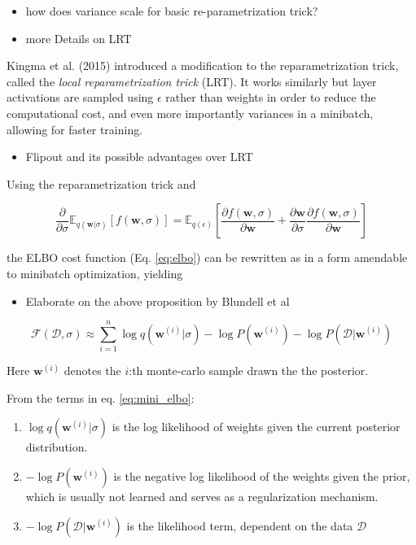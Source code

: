 	\begin{itemize}
		\item how does variance scale for basic re-parametrization trick?
		\item more Details on LRT
	\end{itemize}

	Kingma et al. (2015) \cite{kingma_variational_2015} introduced a modification to the reparametrization trick, called the \textit{local reparametrization trick} (LRT). It works similarly but layer activations are sampled using $\epsilon$ rather than weights in order to reduce the computational cost, and even more importantly variances in a minibatch, allowing for faster training. 
	
	\begin{itemize}
		\item Flipout and its possible advantages over LRT
	\end{itemize}
	
	Using the reparametrization trick and 
	
	\begin{equation}
	\frac{\partial}{\partial \sigma} \mathbb{E}_{q(\pmb{w}|\sigma)}[f(\pmb{w}, \sigma)] =
	\mathbb{E}_{q(\epsilon)}[\frac{\partial f(\pmb{w}, \sigma)}{\partial \pmb{w}} + \frac{\partial \pmb{w}}{\partial \sigma}
	\frac{\partial f(\pmb{w}, \sigma)}{\partial \pmb{w}}]
	\end{equation}
	
	the ELBO cost function (Eq. \ref{eq:elbo}) can be rewritten as in a form amendable to minibatch optimization, yielding
	
	\begin{itemize}
		\item Elaborate on the above proposition by Blundell et al
	\end{itemize}
	
	\begin{equation}
	\label{eq:mini_elbo}
	\mathcal{F}(\mathcal{D}, \sigma) \approx \sum_{i=1}^{n}\log q(\pmb{w}^{(i)}|\sigma) - \log P(\pmb{w}^{(i)}) - \log P(\mathcal{D}|\pmb{w}^{(i)})
	\end{equation}
	
	Here $\pmb{w}^{(i)}$ denotes the $i$:th monte-carlo sample drawn the the posterior.
	
	From the terms in eq. \ref{eq:mini_elbo}:
	\begin{enumerate}
		\item $\log q(\pmb{w}^{(i)}|\sigma)$ is the log likelihood of weights given the current posterior distribution.
		
		\item $-\log P(\pmb{w}^{(i)})$ is the negative log likelihood of the weights given the prior, which is usually not learned and serves as a regularization mechanism. 
		
		\item $- \log P(\mathcal{D}|\pmb{w}^{(i)})$ is the likelihood term, dependent on the data $\mathcal{D}$
	\end{enumerate}
	
